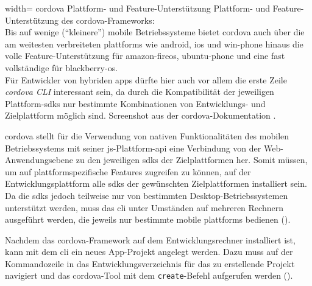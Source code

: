 
	{width=\fullimagesize}
	{\gls{cordova} Plattform- und Feature-Unterstützung}
		{Plattform- und Feature-Unterstützung des \gls{cordova}-Frameworks: \\ 
		Bis auf wenige (\enquote{kleinere}) mobile Betriebssysteme bietet \gls{cordova} auch über die am weitesten verbreiteten \glspl{plattform} wie \gls{android}, \gls{ios} und \gls{win-phone} hinaus die volle Feature-Unterstützung für \gls{amazon-fireos}, \gls{ubuntu-phone} und eine fast vollständige für \gls{blackberry-os}.\\
		Für Entwickler von hybriden \glspl{app} dürfte hier auch vor allem die erste Zeile \emph{cordova CLI} interessant sein, da durch die Kompatibilität der jeweiligen Plattform-\glspl{sdk} nur bestimmte Kombinationen von Entwicklungs- und Zielplattform möglich sind.}
	{Screenshot aus der \gls{cordova}-Dokumentation \cite{Cordova-Docs_Platform-Support}.}


\gls{cordova} stellt für die Verwendung von nativen Funktionalitäten des mobilen Betriebssystems mit seiner \gls{js}-Plattform-\gls{api} eine Verbindung von der Web-Anwendungsebene zu den jeweiligen \glspl{sdk} der Zielplattformen her.
Somit müssen, um auf plattformspezifische Features zugreifen zu können, auf der Entwicklungsplattform alle \glspl{sdk} der gewünschten Zielplattformen installiert sein.
Da die \glspl{sdk} jedoch teilweise nur von bestimmten Desktop-Betriebssystemen unterstützt werden, muss das \gls{cli} unter Umständen auf mehreren Rechnern ausgeführt werden, die jeweils nur bestimmte mobile \glspl{plattform} bedienen ().


Nachdem das \gls{cordova}-Framework auf dem Entwicklungsrechner installiert ist, kann mit dem \gls{cli} ein neues App-Projekt angelegt werden. 
Dazu muss auf der Kommandozeile in das Entwicklungsverzeichnis für das zu erstellende Projekt navigiert und das \gls{cordova}-Tool mit dem \lstinline|create|-Befehl aufgerufen werden ().


